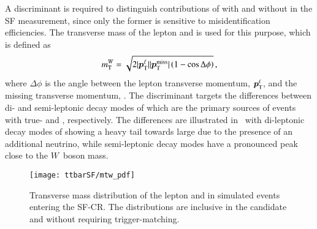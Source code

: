 A discriminant is required to distinguish contributions of \ttbar with and
without \faketauhadvis in the SF measurement, since only the former is sensitive
to \jettotauhadvis misidentification efficiencies. The transverse mass of the
lepton and \pTmissAbs is used for this purpose, which is defined as
\begin{align*}
  m_{\text{T}}^W = \sqrt{2 | \bm{p}_{\text{T}}^{\ell} | | \bm{p}_{\text{T}}^{\text{miss}} | \left( 1 - \cos \Delta\phi \right)} \,\text{,}
\end{align*}
where $\Delta \phi$ is the angle between the lepton transverse momentum,
$\bm{p}_{\text{T}}^{\ell}$, and the missing transverse momentum, \pTmiss. The
\mTW discriminant targets the differences between di- and semi-leptonic decay
modes of \ttbar which are the primary sources of events with true- and
\faketauhadvis, respectively. The differences are illustrated
in~ with di-leptonic decay modes of \ttbar showing a
heavy tail towards large \mTW due to the presence of an additional neutrino,
while semi-leptonic decay modes have a pronounced peak close to the $W$~boson
mass.


\begin{figure}[htbp]
  \centering

  \texttt{[image: ttbarSF/mtw\_pdf]}

  \caption{Transverse mass distribution of the lepton and \pTmiss in simulated
    \ttbar events entering the SF-CR. The distributions are inclusive in the
    \tauhadvis candidate \pT and \Ntracks without requiring \tauhadvis
    trigger-matching.}%
  \label{fig:ttbarsf_mtw_pdf}
\end{figure}

